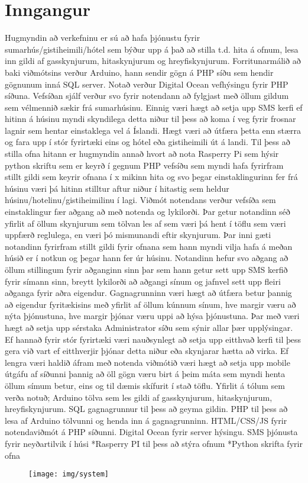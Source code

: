 \section{Inngangur}

Hugmyndin að verkefninu er sú að hafa þjónustu fyrir sumarhús/gistiheimili/hótel sem býður upp á það að stilla t.d. hita á ofnum, lesa inn gildi af gasskynjurum, hitaskynjurum og hreyfiskynjurum. Forritunarmálið að baki viðmótsins verður Arduino, hann sendir gögn á PHP síðu sem hendir gögnunum inná SQL server. Notað verður Digital Ocean vefhýsingu fyrir PHP síðuna. Vefsíðan sjálf verður svo fyrir notendann að fylgjast með öllum gildum sem vélmennið sækir frá sumarhúsinu. Einnig væri hægt að setja upp SMS kerfi ef hitinn á húsinu myndi skyndilega detta niður til þess að koma í veg fyrir frosnar lagnir sem hentar einstaklega vel á Íslandi. Hægt væri að útfæra þetta enn stærra og fara upp í stór fyrirtæki eins og hótel eða gistiheimili út á landi. Til þess að stilla ofna hitann er hugmyndin annað hvort að nota Rasperry Pi sem hýsir python skriftu sem er keyrð í gegnum PHP vefsíðu sem myndi hafa fyrirfram stillt gildi sem keyrir ofnana í x mikinn hita og svo þegar einstaklingurinn fer frá húsinu væri þá hitinn stilltur aftur niður í hitastig sem heldur húsinu/hotelinu/gistiheimilinu í lagi.
Viðmót notendans verður vefsíða sem einstaklingur fær aðgang að með notenda og lykilorði. Þar getur notandinn séð yfirlit af öllum skynjurum sem tölvan les af sem væri þá hent í töflu sem væri uppfærð reglulega, en væri þó mismunandi eftir skynjurum.
Þar inni gæti notandinn fyrirfram stillt gildi fyrir ofnana sem hann myndi vilja hafa á meðan húsið er í notkun og þegar hann fer úr húsinu. Notandinn hefur svo aðgang að öllum stillingum fyrir aðganginn sinn þar sem hann getur sett upp SMS kerfið fyrir símann sinn, breytt lykilorði að aðgangi sínum og jafnvel sett upp fleiri aðganga fyrir aðra eigendur. Gagnagrunninn væri hægt að útfæra betur þannig að eigendur fyritækisins með yfirlit af öllum kúnnum sínum, hve margir væru að nýta þjónustuna, hve margir þjónar væru uppi að hýsa þjónustuna. Þar með væri hægt að setja upp sérstaka Administrator síðu sem sýnir allar þær upplýsingar.   
Ef hannað fyrir stór fyrirtæki væri nauðsynlegt að setja upp eitthvað kerfi til þess gera við vart ef eitthverjir þjónar detta niður eða skynjarar hætta að virka. 
Ef lengra væri haldið áfram með notenda viðmótið væri hægt að setja upp mobile útgáfu af síðunni þannig að öll gögn væru birt á þeim máta sem myndi henta öllum símum betur, eins og til dæmis skífurit í stað töflu. 
Yfirlit á tólum sem verða notuð;
Arduino tölva sem les gildi af gasskynjurum, hitaskynjurum, hreyfiskynjurum.
SQL gagnagrunnur til þess að geyma gildin.
PHP til þess að lesa af Arduino tölvunni og henda inn á gagnagrunninn.
HTML/CSS/JS fyrir notendaviðmót á PHP síðunni.
Digital Ocean fyrir server hýsingu.
SMS þjónusta fyrir neyðartilvik í húsi
*Rasperry PI til þess að stýra ofnum
*Python skrifta fyrir ofna

\begin{figure}[h]
\texttt{[image: img/system]}
\end{figure}